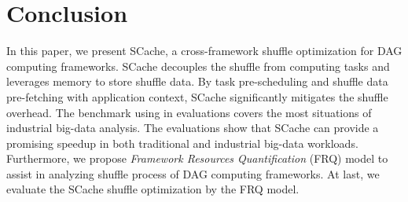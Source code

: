 \section{Conclusion}
In this paper, we present SCache, a cross-framework shuffle optimization for DAG computing frameworks. 
SCache decouples the shuffle from computing tasks and leverages memory to store shuffle data. 
By task pre-scheduling and shuffle data pre-fetching with application context, SCache significantly mitigates the shuffle overhead. 
{\color{black}
The benchmark using in evaluations covers the most situations of industrial big-data analysis.
The evaluations show that SCache can provide a promising speedup in both traditional and industrial big-data workloads. 
Furthermore, we propose \textit{Framework Resources Quantification} (FRQ) model to assist in analyzing shuffle process of DAG computing frameworks. At last, we evaluate the SCache shuffle optimization by the FRQ model.
}
